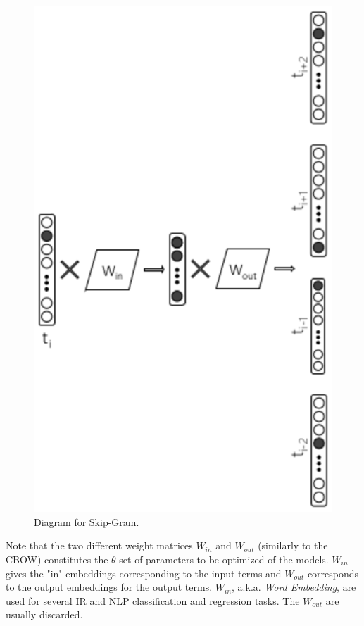 \begin{figure}[t]
	\begin{center} 
    	\includegraphics[scale=0.99]{Figures/skip_gram.eps}
		\caption{Diagram for Skip-Gram.}
		\label{chap:word_embeddingss:fig:skipgram_diagram}
	\end{center}
\end{figure}


Note that the two different weight matrices $W_{in}$ and $W_{out}$ (similarly to the CBOW) constitutes the $\theta$ set of parameters to be optimized of the models. $W_{in}$ gives the "in" embeddings corresponding to the input terms and $W_{out}$ corresponds to the output embeddings for the output terms. $W_{in}$, a.k.a. \textit{Word Embedding}, are used for several IR and NLP classification and regression tasks. The $W_{out}$ are usually discarded. 

